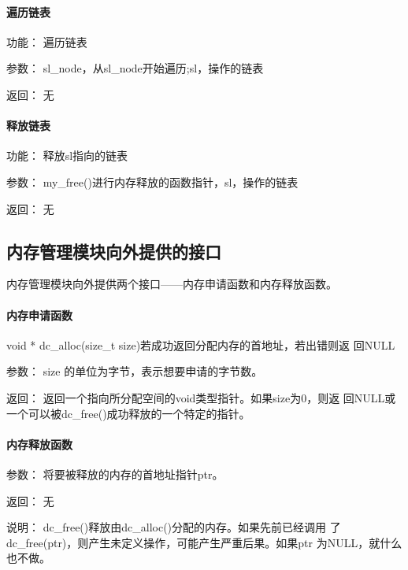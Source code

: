 \paragraph{遍历链表}
	\begin{compactdesc}
	\item[功能：]遍历链表
	\item[参数：]sl\_node，从sl\_node开始遍历;sl，操作的链表
	\item[返回：]无
	\end{compactdesc}
\paragraph{ 释放链表}
	\begin{compactdesc}
	\item[功能：]释放sl指向的链表
	\item[参数：]my\_free()进行内存释放的函数指针，sl，操作的链表
	\item[返回：]无
	\end{compactdesc}


\subsection{内存管理模块向外提供的接口}
内存管理模块向外提供两个接口——内存申请函数和内存释放函数。
\paragraph{内存申请函数}
	{void * dc\_alloc(size\_t size)}{若成功返回分配内存的首地址，若出错则返
	回NULL}
	\begin{compactdesc}
	\item[参数：]size 的单位为字节，表示想要申请的字节数。
	\item[返回：]返回一个指向所分配空间的void类型指针。如果size为0，则返
	回NULL或一个可以被dc\_free()成功释放的一个特定的指针。
	\end{compactdesc}
\paragraph{内存释放函数}
	\begin{compactdesc}
	\item[参数：]将要被释放的内存的首地址指针ptr。
	\item[返回：]无
	\item[说明：]dc\_free()释放由dc\_alloc()分配的内存。如果先前已经调用
		了dc\_free(ptr)，则产生未定义操作，可能产生严重后果。如果ptr
		为NULL，就什么也不做。 
	\end{compactdesc}


%
